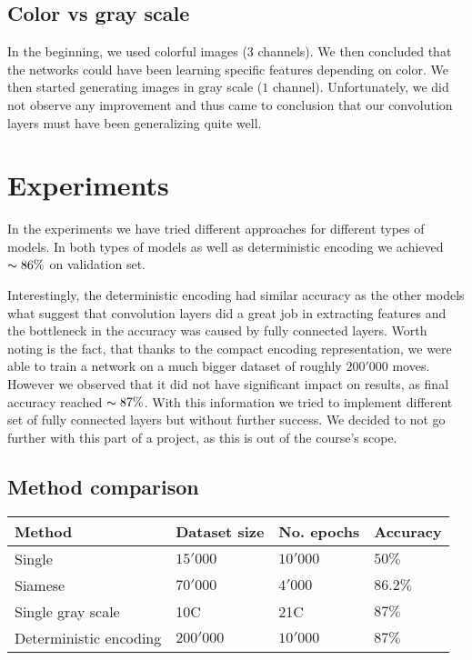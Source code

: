 \documentclass[10pt,twocolumn,letterpaper]{article}
\begin{document}
\subsection{Color vs gray scale}

In the beginning, we used colorful images ($3$ channels). We then concluded that
the networks could have been learning specific features depending on color. We
then started generating images in gray scale ($1$ channel). Unfortunately, we
did not observe any improvement and thus came to conclusion that our convolution
layers must have been generalizing quite well.

\section{Experiments}

In the experiments we have tried different approaches for different types of
models. In both types of models as well as deterministic encoding we achieved
$\thicksim 86\%$ on validation set.

Interestingly, the deterministic encoding had similar accuracy as the other
models what suggest that convolution layers did a great job in extracting
features and the bottleneck in the accuracy was caused by fully connected
layers. Worth noting is the fact, that thanks to the compact encoding
representation, we were able to train a network on a much bigger dataset of
roughly $200'000$ moves. However we observed that it did not have significant
impact on results, as final accuracy reached $\thicksim 87\%$. With this
information we tried to implement different set of fully connected layers but
without further success. We decided to not go further with this part of a
project, as this is out of the course's scope.

\subsection{Method comparison}

\begin{center}
    \begin{tabular}{ | p{5em} | p{5em} | p{5em} | p{5em} |}
    \hline
    Method & Dataset size & No. epochs & Accuracy \\ [0.5ex] \hline \hline
    Single & $15'000$ & $10'000$ & $50\%$ \\
    \hline
    Siamese & $70'000$ & $4'000$ & $86.2\%$ \\ \hline
    Single gray scale & 10C & 21C & $87\%$ \\
    \hline
    Deterministic encoding & $200'000$ & $10'000$ & $87\%$ \\
    \hline
    \end{tabular}
\end{center}
\end{document}
